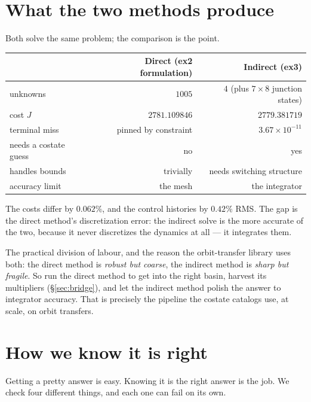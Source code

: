 \documentclass[11pt]{article}
\begin{document}
\section{What the two methods produce}

Both solve the same problem; the comparison is the point.

\begin{center}
\begin{tabular}{lrr}
\toprule
& \textbf{Direct (ex2 formulation)} & \textbf{Indirect (ex3)}\\
\midrule
unknowns & $1005$ & $4$ (plus $7\times8$ junction states)\\
cost $J$ & $2781.109846$ & $2779.381719$\\
terminal miss & pinned by constraint & $3.67\times10^{-11}$\\
needs a costate guess & no & yes\\
handles bounds & trivially & needs switching structure\\
accuracy limit & the mesh & the integrator\\
\bottomrule
\end{tabular}
\end{center}

The costs differ by $0.062\%$, and the control histories by $0.42\%$ RMS. The
gap is the direct method's discretization error: the indirect solve is the more
accurate of the two, because it never discretizes the dynamics at all --- it
integrates them.

\begin{intu}
The practical division of labour, and the reason the orbit-transfer library uses
both: the direct method is \emph{robust but coarse}, the indirect method is
\emph{sharp but fragile}. So run the direct method to get into the right basin,
harvest its multipliers (\S\ref{sec:bridge}), and let the indirect method polish
the answer to integrator accuracy. That is precisely the pipeline the costate
catalogs use, at scale, on orbit transfers.
\end{intu}

\section{How we know it is right}

\begin{eli}
Getting a pretty answer is easy. Knowing it is the right answer is the job. We
check four different things, and each one can fail on its own.
\end{eli}
\end{document}
